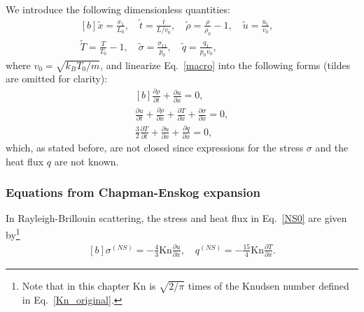 





We introduce the following dimensionless quantities: 
\begin{equation}
\begin{aligned}[b]
\tilde{x}=\frac{x_1}{L_0}, \quad
\tilde{t}=\frac{t}{L/v_0}, \quad
\tilde{\rho}=\frac{\rho}{\rho_0}-1, \quad
\tilde{u}=\frac{u_1}{v_0},\quad
 \\
\tilde{T}=\frac{T}{T_0}-1, \quad
\tilde{\sigma}=\frac{\sigma_{11}}{p_0}, \quad
\tilde{q}=\frac{q_1}{p_0v_0},
\end{aligned}
\end{equation}
where $v_0=\sqrt{k_BT_0/m}$, and linearize Eq.~\eqref{macro} into the following forms (tildes are omitted for clarity):
\begin{equation}\label{NS0}
\begin{aligned}[b]
\frac{\partial \rho}{\partial t}+\frac{\partial u}{\partial x}=0,\\
\frac{\partial u}{\partial t}+\frac{\partial \rho}{\partial x}+\frac{\partial {T}}{\partial x}+\frac{\partial \sigma}{\partial x}=0,\\
\frac{3}{2}\frac{\partial {T}}{\partial t}+\frac{\partial u}{\partial x}+\frac{\partial q}{\partial x}=0,
\end{aligned}
\end{equation}
which, as stated before, are not closed since  expressions for the stress $\sigma$ and the heat flux $q$ are not known.


\subsubsection{Equations from Chapman-Enskog expansion}

In Rayleigh-Brillouin scattering, the stress and heat flux in Eq.~\eqref{NS0} are given by\footnote{Note that in this chapter $\text{Kn}$ is $\sqrt{2/\pi}$ times of the Knudsen number defined in Eq.~\eqref{Kn_original}.} 
\begin{equation}\label{NS_law}
\begin{aligned}[b]
\sigma^{(NS)}=-\frac{4}{3}\text{Kn}\frac{\partial u}{\partial x},\quad
q^{(NS)}=-\frac{15}{4}\text{Kn}\frac{\partial {T}}{\partial x}.
\end{aligned}
\end{equation}


